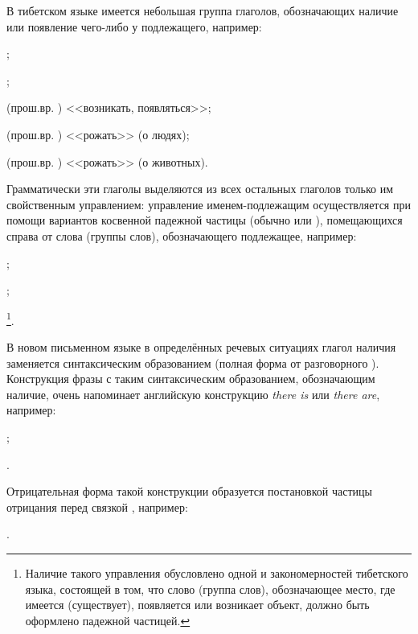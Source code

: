 В тибетском языке имеется небольшая группа глаголов,
обозначающих наличие или появление чего-либо у подлежащего, например:
\begin{prfsample}
	\item {};
	\item {};
	\item {} (прош.вр. ) <<возникать, появляться>>;
	\item {} (прош.вр. ) <<рожать>> (о людях);
	\item {} (прош.вр. ) <<рожать>> (о животных).
\end{prfsample}
Грамматически эти глаголы выделяются из всех остальных глаголов только им свойственным управлением: управление именем-подлежащим осуществляется при помощи вариантов косвенной падежной частицы (обычно  или ), помещающихся справа от слова (группы слов), обозначающего подлежащее, например:
\begin{prfsample}
	\item {};
	\item {};
	\item {}\footnote[34]{Наличие такого управления обусловлено одной и закономерностей тибетского языка, состоящей в том, что слово (группа слов), обозначающее место, где имеется (существует), появляется или возникает объект, должно быть оформлено падежной частицей.}.
\end{prfsample}

В новом письменном языке в определённых речевых ситуациях глагол наличия  заменяется синтаксическим образованием  (полная форма от разговорного ). Конструкция фразы с таким синтаксическим образованием, обозначающим наличие, очень напоминает английскую конструкцию \emph{there is} или \emph{there are}, например:
\begin{prfsample}
	\item {};
	\item {}.
\end{prfsample}
Отрицательная форма такой конструкции образуется постановкой частицы отрицания перед связкой , например:
\begin{prfsample}
	\item {}.
\end{prfsample}

